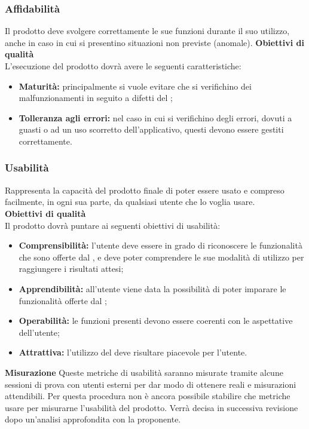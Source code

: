 \subsubsection{Affidabilità}
Il prodotto  deve svolgere correttamente le sue funzioni durante il suo utilizzo, anche in caso in cui si presentino situazioni non previste (anomale).
\textbf{Obiettivi di qualità}\\
L'esecuzione del prodotto dovrà avere le seguenti caratteristiche:
\begin{itemize}
	\item \textbf{Maturità:} principalmente si vuole evitare che si verifichino dei malfunzionamenti in seguito a difetti del ;
	\item \textbf{Tolleranza agli errori:} nel caso in cui si verifichino degli errori, dovuti a guasti o ad un uso scorretto dell'applicativo, questi devono essere gestiti correttamente.
\end{itemize}

\subsubsection{Usabilità}
Rappresenta la capacità del prodotto finale di poter essere usato e compreso facilmente, in ogni sua parte, da qualsiasi utente che lo voglia usare.\\[0.4cm]
\textbf{Obiettivi di qualità}\\[0.4cm]
Il prodotto dovrà puntare ai seguenti obiettivi di usabilità:
\begin{itemize}
	\item \textbf{Comprensibilità:} l'utente deve essere in grado di riconoscere le funzionalità che sono offerte dal , e deve poter comprendere le sue modalità di utilizzo per raggiungere i risultati attesi;
	\item \textbf{Apprendibilità:} all'utente viene data la possibilità di poter imparare le funzionalità offerte dal ;
	\item \textbf{Operabilità:} le funzioni presenti devono essere coerenti con le aspettative dell'utente;
	\item \textbf{Attrattiva:} l'utilizzo del  deve risultare piacevole per l'utente.
\end{itemize}
\textbf{Misurazione}
Queste metriche di usabilità saranno misurate tramite alcune sessioni di prova con utenti esterni per dar modo di ottenere  reali e misurazioni attendibili. Per questa procedura non è ancora possibile stabilire che metriche usare per misurarne l'usabilità del prodotto. Verrà decisa in successiva revisione dopo un'analisi approfondita con la proponente.

